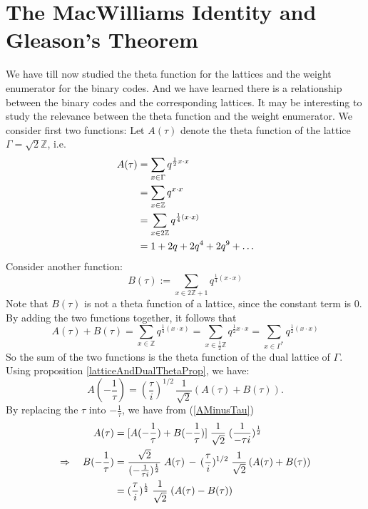 \documentclass{article}
\numberwithin{equation}{theorem}
\numberwithin{figure}{theorem}
\newcommand{\Integer}{\ensuremath{\mathbb{Z}}}
\newcommand{\imaginary}{\ensuremath{i}}
\begin{document}
\section{The MacWilliams Identity and Gleason's Theorem}\label{sectionMacWill}
We have till now studied the theta function for the lattices and the weight enumerator for the binary codes. And we have learned there is a relationship between the binary codes and the corresponding lattices. It may be interesting to study the relevance between the theta function and the weight enumerator.
We consider first two functions:
Let $A(\tau)$ denote the theta function of the lattice $\Gamma = \sqrt{2}\Integer$, i.e.
	\begin{align}
	A(\tau) &= \sum_{x \in \Gamma}q^{\frac{1}{2}x\cdot x} \notag\\
			&= \sum_{x \in \Integer}q^{x\cdot x} \notag\\
			&= \sum_{x \in 2\Integer}q^{\frac{1}{4}(x\cdot x)}\label{Afunc}\\
			&= 1 + 2q + 2q^4 + 2q^9 + \ldots \notag
	\end{align}
Consider another function:
\begin{equation}\label{Bfunc}
	B(\tau) := \sum_{x \in 2\Integer + 1}q^{\frac{1}{4}(x\cdot x)}
\end{equation}
Note that $B(\tau)$ is not a theta function of a lattice, since the constant term is 0.
By adding the two functions together, it follows that
\begin{equation}\label{sumABfuncEq}
	A(\tau) + B(\tau) = \sum_{x \in \Integer}q^{\frac{1}{4}(x\cdot x)} = \sum_{x \in \frac{1}{2}\Integer}q^{\frac{1}{2}x \cdot x}
			= \sum_{x\in \Gamma^{*}}q^{\frac{1}{2}(x\cdot x)}
\end{equation}
So the sum of the two functions is the theta function of the dual lattice of $\Gamma$. Using proposition \ref{latticeAndDualThetaProp}, we have:
\begin{equation}\label{AMinusTau}
	A(-\frac{1}{\tau}) = (\frac{\tau}{\imaginary})^{1/2} \, \frac{1}{\sqrt{2}}(A(\tau) + B(\tau)).
\end{equation}
By replacing the $\tau$ into $-\frac{1}{\tau}$, we have from (\ref{AMinusTau})
\begin{align}
	A(\tau)&= [A(-\frac{1}{\tau}) + B(-\frac{1}{\tau})]\; \frac{1}{\sqrt{2}}\; (\frac{1}{-\tau \imaginary})^{\frac{1}{2}}  \notag \\
	\Rightarrow \quad B(-\frac{1}{\tau}) &= \frac{\sqrt{2}}{(-\frac{1}{\tau \imaginary})^{\frac{1}{2}}} \; A(\tau) \,- \,(\frac{\tau}{\imaginary})^{1/2} \; \frac{1}{\sqrt{2}}\,(A(\tau) + B(\tau))\notag\\
	&= (\frac{\tau}{\imaginary})^{\frac{1}{2}} \;\frac{1}{\sqrt{2}}\;(A(\tau) - B(\tau)) \label{BMinusTau}
\end{align}
\end{document}
